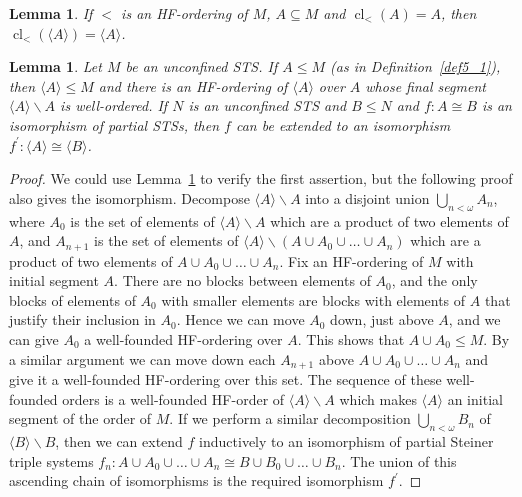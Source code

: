\documentclass[10pt,a4paper]{article}
\DeclareMathOperator{\cl}{cl}
\theoremstyle{note}
\newtheorem{lemma}[thm]{Lemma}
\begin{document}
\begin{lemma}\label{order_closure}
	If $<$ is an HF-ordering of $M$,  $A\subseteq M$  and $\cl_<(A)=A$, then  $\cl_<(\langle A\rangle )= \langle A \rangle$.
\end{lemma}

\begin{lemma} \label{May_26_2024_2} Let $M$ be an unconfined STS.  If $A\leq M$ (as in Definition~\ref{def5_1}), then  $\langle A\rangle \leq M$ and there is an HF-ordering of $\langle A\rangle$ over $A$ whose final segment $\langle A\rangle \smallsetminus A$ is well-ordered. If $N$ is an unconfined STS and $B\leq N$ and $f:A\cong B$ is an isomorphism of partial STSs, then $f$ can be extended to an isomorphism $f^\prime :\langle A\rangle \cong \langle B \rangle$.
\end{lemma}

\begin{proof} We could use Lemma~\ref{order_closure} to verify the first assertion, but the following proof also gives the isomorphism. Decompose $\langle A\rangle\smallsetminus A$ into a disjoint union $\bigcup_{n<\omega}A_n$,  where $A_0$ is the set of elements of $\langle A\rangle\smallsetminus A$ which are a product of two elements of $A$,  and $A_{n+1}$ is the set of elements of  $\langle A\rangle\smallsetminus (A\cup A_0\cup \ldots\cup A_n)$  which are a product of two elements of  $A\cup A_0\cup\ldots\cup A_n$. Fix an HF-ordering of $M$ with initial segment $A$. There are no blocks between elements of $A_0$, and the only blocks of elements of $A_0$ with smaller elements are blocks with elements of $A$ that justify their inclusion in $A_0$. Hence we can move  $A_0$ down, just above $A$,  and we can give $A_0$ a well-founded HF-ordering over $A$. This shows that $A\cup A_0\leq M$. By a similar argument we can move down each $A_{n+1}$ above $A\cup A_0\cup \ldots \cup A_n$ and give it a well-founded HF-ordering over this set. The sequence of these well-founded orders is a well-founded HF-order of $\langle A\rangle \smallsetminus A$  which makes  $\langle A\rangle$ an initial segment of the order of $M$. If we perform a similar decomposition $\bigcup_{n<\omega}B_n$ of $\langle B\rangle\smallsetminus B$, then we can  extend $f$ inductively to an isomorphism of partial Steiner triple systems  $f_n : A\cup A_0 \cup \ldots \cup A_n\cong B\cup B_0\cup\ldots \cup B_n$. The union of this ascending chain of isomorphisms is the required isomorphism $f^\prime$.
\end{proof}
\end{document}
